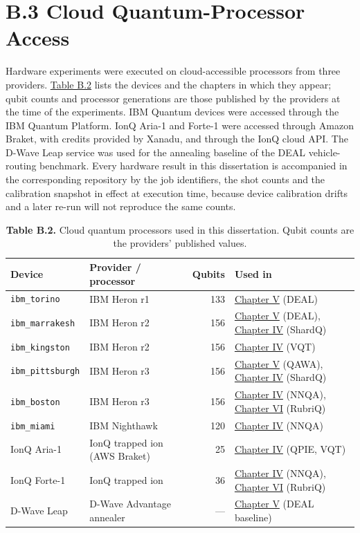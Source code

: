 \documentclass{report}
\theoremstyle{plain}
\theoremstyle{definition}
\theoremstyle{remark}
\begin{document}
\section{B.3 Cloud Quantum-Processor Access}\label{sec:apprepro:qpu}

Hardware experiments were executed on cloud-accessible processors from three providers. \hyperref[tab:apprepro:devices]{Table B.2} lists the devices and the chapters in which they appear; qubit counts and processor generations are those published by the providers at the time of the experiments. IBM Quantum devices were accessed through the IBM Quantum Platform. IonQ Aria-1 and Forte-1 were accessed through Amazon Braket, with credits provided by Xanadu, and through the IonQ cloud API. The D-Wave Leap service was used for the annealing baseline of the DEAL vehicle-routing benchmark. Every hardware result in this dissertation is accompanied in the corresponding repository by the job identifiers, the shot counts and the calibration snapshot in effect at execution time, because device calibration drifts and a later re-run will not reproduce the same counts.

\begin{table}[htbp]
\caption{\textbf{Table B.2.} Cloud quantum processors used in this dissertation. Qubit counts are the providers' published values.}
\label{tab:apprepro:devices}
 
  \footnotesize
\begin{tabular}{llrl}
\toprule
Device & Provider / processor & Qubits & Used in \\
\midrule
\texttt{ibm\_torino} & IBM Heron r1 & 133 & \hyperref[ch:nisq]{Chapter V} (DEAL) \\
\texttt{ibm\_marrakesh} & IBM Heron r2 & 156 & \hyperref[ch:nisq]{Chapter V} (DEAL), \hyperref[ch:qml]{Chapter IV} (ShardQ) \\
\texttt{ibm\_kingston} & IBM Heron r2 & 156 & \hyperref[ch:qml]{Chapter IV} (VQT) \\
\texttt{ibm\_pittsburgh} & IBM Heron r3 & 156 & \hyperref[ch:nisq]{Chapter V} (QAWA), \hyperref[ch:qml]{Chapter IV} (ShardQ) \\
\texttt{ibm\_boston} & IBM Heron r3 & 156 & \hyperref[ch:qml]{Chapter IV} (NNQA), \hyperref[ch:synthesis]{Chapter VI} (RubriQ) \\
\texttt{ibm\_miami} & IBM Nighthawk & 120 & \hyperref[ch:qml]{Chapter IV} (NNQA) \\
IonQ Aria-1 & IonQ trapped ion (AWS Braket) & 25 & \hyperref[ch:qml]{Chapter IV} (QPIE, VQT) \\
IonQ Forte-1 & IonQ trapped ion & 36 & \hyperref[ch:qml]{Chapter IV} (NNQA), \hyperref[ch:synthesis]{Chapter VI} (RubriQ) \\
D-Wave Leap & D-Wave Advantage annealer & --- & \hyperref[ch:nisq]{Chapter V} (DEAL baseline) \\
\bottomrule
\end{tabular}
 
\end{table}
\end{document}
